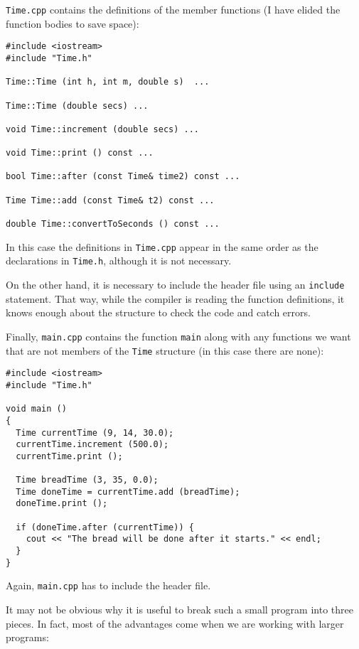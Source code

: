 {\tt Time.cpp} contains the definitions of the member functions
(I have elided the function bodies to save space):

\begin{verbatim}
#include <iostream>
#include "Time.h"

Time::Time (int h, int m, double s)  ...

Time::Time (double secs) ...

void Time::increment (double secs) ...

void Time::print () const ...

bool Time::after (const Time& time2) const ...

Time Time::add (const Time& t2) const ...

double Time::convertToSeconds () const ...
\end{verbatim}
%
In this case the definitions in {\tt Time.cpp} appear in the
same order as the declarations in {\tt Time.h}, although it
is not necessary.

On the other hand, it is necessary to include the header
file using an {\tt include} statement.  That way, while the
compiler is reading the function definitions, it knows enough
about the structure to check the code and catch errors.

Finally, {\tt main.cpp} contains the function {\tt main} along
with any functions we want that are not members of the {\tt Time}
structure (in this case there are none):

\begin{verbatim}
#include <iostream>
#include "Time.h"

void main ()
{
  Time currentTime (9, 14, 30.0);
  currentTime.increment (500.0);
  currentTime.print ();

  Time breadTime (3, 35, 0.0);
  Time doneTime = currentTime.add (breadTime);
  doneTime.print ();

  if (doneTime.after (currentTime)) {
    cout << "The bread will be done after it starts." << endl;
  }
}

\end{verbatim}
%
Again, {\tt main.cpp} has to include the header file.

It may not be obvious why it is useful to break such a small
program into three pieces.  In fact, most of the advantages come
when we are working with larger programs:

